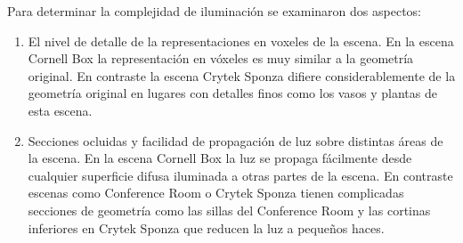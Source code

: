 Para determinar la complejidad de iluminación se examinaron dos aspectos:

\begin{enumerate}
	\item El nivel de detalle de la representaciones en voxeles de la escena. En la escena Cornell Box la representación en vóxeles es muy similar a la geometría original. En contraste la escena Crytek Sponza difiere considerablemente de la geometría original en lugares con detalles finos como los vasos y plantas de esta escena.
	\item Secciones ocluidas y facilidad de propagación de luz sobre distintas áreas de la escena. En la escena Cornell Box la luz se propaga fácilmente desde cualquier superficie difusa iluminada a otras partes de la escena. En contraste escenas como Conference Room o Crytek Sponza tienen complicadas secciones de geometría como las sillas del Conference Room y las cortinas inferiores en Crytek Sponza que reducen la luz a pequeños haces.
\end{enumerate}